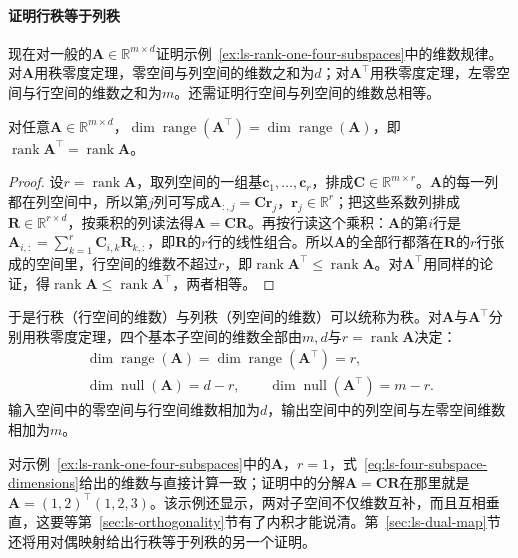 \paragraph{证明行秩等于列秩}
现在对一般的$\bm A\in\mathbb R^{m\times d}$证明示例~\ref{ex:ls-rank-one-four-subspaces}中的维数规律。对$\bm A$用秩零度定理，零空间与列空间的维数之和为$d$；对$\bm A^\top$用秩零度定理，左零空间与行空间的维数之和为$m$。还需证明行空间与列空间的维数总相等。
\begin{theorem}[行秩等于列秩]
\label{thm:ls-row-rank-column-rank}
对任意$\bm A\in\mathbb R^{m\times d}$，$\dim\operatorname{range}(\bm A^\top)=\dim\operatorname{range}(\bm A)$，即$\operatorname{rank}\bm A^\top=\operatorname{rank}\bm A$。
\end{theorem}
\begin{proof}
设$r=\operatorname{rank}\bm A$，取列空间的一组基$\bm c_1,\ldots,\bm c_r$，排成$\bm C\in\mathbb R^{m\times r}$。$\bm A$的每一列都在列空间中，所以第$j$列可写成$\bm A_{:,j}=\bm C\bm r_j$，$\bm r_j\in\mathbb R^r$；把这些系数列排成$\bm R\in\mathbb R^{r\times d}$，按乘积的列读法得$\bm A=\bm C\bm R$。再按行读这个乘积：$\bm A$的第$i$行是$\bm A_{i,:}=\sum_{k=1}^r\bm C_{i,k}\bm R_{k,:}$，即$\bm R$的$r$行的线性组合。所以$\bm A$的全部行都落在$\bm R$的$r$行张成的空间里，行空间的维数不超过$r$，即$\operatorname{rank}\bm A^\top\leq\operatorname{rank}\bm A$。对$\bm A^\top$用同样的论证，得$\operatorname{rank}\bm A\leq\operatorname{rank}\bm A^\top$，两者相等。
\end{proof}
于是行秩（行空间的维数）与列秩（列空间的维数）可以统称为秩。对$\bm A$与$\bm A^\top$分别用秩零度定理，四个基本子空间的维数全部由$m,d$与$r=\operatorname{rank}\bm A$决定：
\begin{equation}
 \begin{gathered}
 \dim\operatorname{range}(\bm A)=\dim\operatorname{range}(\bm A^\top)=r,\\
 \dim\operatorname{null}(\bm A)=d-r,\qquad
 \dim\operatorname{null}(\bm A^\top)=m-r.
 \end{gathered}
 \label{eq:ls-four-subspace-dimensions}
\end{equation}
输入空间中的零空间与行空间维数相加为$d$，输出空间中的列空间与左零空间维数相加为$m$。

对示例~\ref{ex:ls-rank-one-four-subspaces}中的$\bm A$，$r=1$，式~\eqref{eq:ls-four-subspace-dimensions}给出的维数与直接计算一致；证明中的分解$\bm A=\bm C\bm R$在那里就是$\bm A=(1,2)^\top(1,2,3)$。该示例还显示，两对子空间不仅维数互补，而且互相垂直，这要等第~\ref{sec:ls-orthogonality}节有了内积才能说清。第~\ref{sec:ls-dual-map}节还将用对偶映射给出行秩等于列秩的另一个证明。

